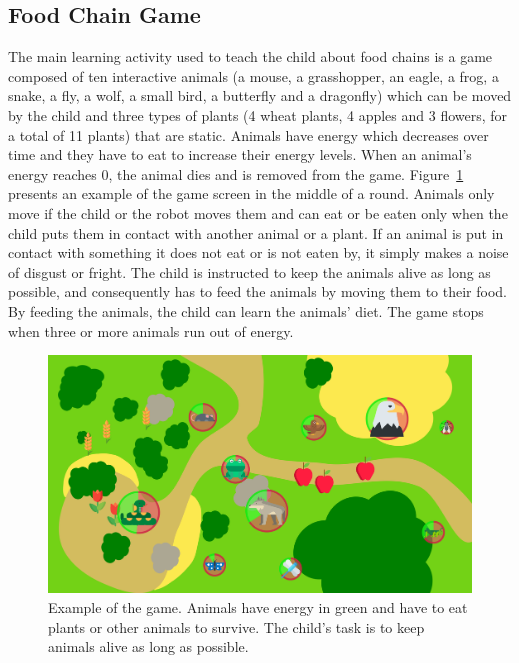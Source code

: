\subsection{Food Chain Game}

The main learning activity used to teach the child about food chains is a game composed of ten interactive animals (a mouse, a grasshopper, an eagle, a frog, a snake, a fly, a wolf, a small bird, a butterfly and a dragonfly) which can be moved by the child and three types of plants (4 wheat plants, 4 apples and 3 flowers, for a total of 11 plants) that are static. Animals have energy which decreases over time and they have to eat to increase their energy levels. When an animal's energy reaches 0, the animal dies and is removed from the game. Figure~\ref{fig:tutoring_game} presents an example of the game screen in the middle of a round. Animals only move if the child or the robot moves them and can eat or be eaten only when the child puts them in contact with another animal or a plant. If an animal is put in contact with something it does not eat or is not eaten by, it simply makes a noise of disgust or fright. The child is instructed to keep the animals alive as long as possible, and consequently has to feed the animals by moving them to their food. By feeding the animals, the child can learn the animals' diet. The game stops when three or more animals run out of energy.

\begin{figure}[ht]
	\centering
		\includegraphics[width=1\textwidth]{game.png}
		\caption{Example of the game. Animals have energy in green and have to eat plants or other animals to survive. The child's task is to keep animals alive as long as possible.}
		\label{fig:tutoring_game}
\end{figure}

